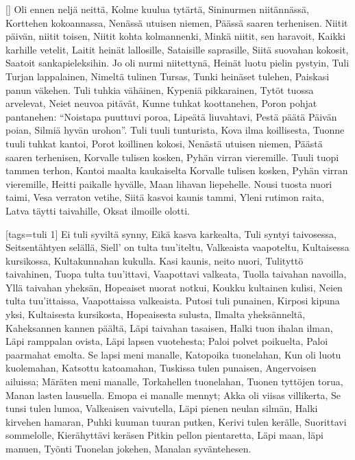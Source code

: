[]
  \beginverse
    Oli ennen neljä neittä,
    Kolme kuulua tytärtä,
    Sininurmen niitännässä,
    Korttehen kokoannassa,
    Nenässä utuisen niemen,
    Päässä saaren terhenisen.
    Niitit päivän, niitit toisen,
    Niitit kohta kolmannenki,
    Minkä niitit, sen haravoit,
    Kaikki karhille vetelit,
    Laitit heinät lallosille,
    Sataisille saprasille,
    Siitä suovahan kokosit,
    Saatoit sankapieleksihin.
  \endverse
  \beginverse
    Jo oli nurmi niitettynä,
    Heinät luotu pielin pystyin,
    Tuli Turjan lappalainen,
    Nimeltä tulinen Tursas,
    Tunki heinäset tulehen,
    Paiskasi panun väkehen.
  \endverse
  \beginverse
    Tuli tuhkia vähäinen,
    Kypeniä pikkarainen,
    Tytöt tuossa arvelevat,
    Neiet neuvoa pitävät,
    Kunne tuhkat koottanehen,
    Poron pohjat pantanehen:
    ``Noistapa puuttuvi poroa,
    Lipeätä liuvahtavi,
    Pestä päätä Päivän poian,
    Silmiä hyvän urohon''.
  \endverse
  \beginverse
    Tuli tuuli tunturista,
    Kova ilma koillisesta,
    Tuonne tuuli tuhkat kantoi,
    Porot koillinen kokosi,
    Nenästä utuisen niemen,
    Päästä saaren terhenisen,
    Korvalle tulisen kosken,
    Pyhän virran vieremille.
    Tuuli tuopi tammen terhon,
    Kantoi maalta kaukaiselta
    Korvalle tulisen kosken,
    Pyhän virran vieremille,
    Heitti paikalle hyvälle,
    Maan lihavan liepehelle.
    Nousi tuosta nuori taimi,
    Vesa verraton vetihe,
    Siitä kasvoi kaunis tammi,
    Yleni rutimon raita,
    Latva täytti taivahille,
    Oksat ilmoille olotti.
  \endverse
\endsong


[tags={tuli 1}]
  \beginverse
    Ei tuli syviltä synny,
    Eikä kasva karkealta,
    Tuli syntyi taivosessa,
    Seitsentähtyen selällä,
    Siell' on tulta tuu'iteltu,
    Valkeaista vaapoteltu,
    Kultaisessa kursikossa,
    Kultakunnahan kukulla.
  \endverse
  \beginverse
    Kasi kaunis, neito nuori,
    Tulityttö taivahinen,
    Tuopa tulta tuu'ittavi,
    Vaapottavi valkeata,
    Tuolla taivahan navoilla,
    Yllä taivahan yheksän,
    Hopeaiset nuorat notkui,
    Koukku kultainen kulisi,
    Neien tulta tuu'ittaissa,
    Vaapottaissa valkeaista.
  \endverse
  \beginverse
    Putosi tuli punainen,
    Kirposi kipuna yksi,
    Kultaisesta kursikosta,
    Hopeaisesta sulusta,
    Ilmalta yheksänneltä,
    Kaheksannen kannen päältä,
    Läpi taivahan tasaisen,
    Halki tuon ihalan ilman,
    Läpi ramppalan ovista,
    Läpi lapsen vuotehesta;
    Paloi polvet poikuelta,
    Paloi paarmahat emolta.
  \endverse
  \beginverse
    Se lapsi meni manalle,
    Katopoika tuonelahan,
    Kun oli luotu kuolemahan,
    Katsottu katoamahan,
    Tuskissa tulen punaisen,
    Angervoisen ailuissa;
    Märäten meni manalle,
    Torkahellen tuonelahan,
    Tuonen tyttöjen torua,
    Manan lasten lausuella.
  \endverse
  \beginverse
    Emopa ei manalle mennyt;
    Akka oli viisas villikerta,
    Se tunsi tulen lumoa,
    Valkeaisen vaivutella,
    Läpi pienen neulan silmän,
    Halki kirvehen hamaran,
    Puhki kuuman tuuran putken,
    Kerivi tulen kerälle,
    Suorittavi sommelolle,
    Kierähyttävi keräsen
    Pitkin pellon pientaretta,
    Läpi maan, läpi manuen,
    Työnti Tuonelan jokehen,
    Manalan syväntehesen.
  \endverse
\endsong


